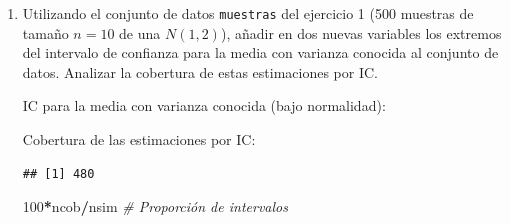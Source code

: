 \documentclass[
]{book}
\newenvironment{Shaded}{\begin{snugshade}}{\end{snugshade}}
\newcommand{\CommentTok}[1]{\textcolor[rgb]{0.56,0.35,0.01}{\textit{#1}}}
\newcommand{\DecValTok}[1]{\textcolor[rgb]{0.00,0.00,0.81}{#1}}
\newcommand{\FloatTok}[1]{\textcolor[rgb]{0.00,0.00,0.81}{#1}}
\newcommand{\KeywordTok}[1]{\textcolor[rgb]{0.13,0.29,0.53}{\textbf{#1}}}
\newcommand{\NormalTok}[1]{#1}
\newcommand{\OperatorTok}[1]{\textcolor[rgb]{0.81,0.36,0.00}{\textbf{#1}}}
\newcommand{\StringTok}[1]{\textcolor[rgb]{0.31,0.60,0.02}{#1}}
\theoremstyle{break}
\theoremstyle{definition}
\theoremstyle{definition}
\theoremstyle{definition}
\theoremstyle{remark}
\begin{document}
\begin{enumerate}
\def\labelenumi{\alph{enumi})}
\item
  Utilizando el conjunto de datos \texttt{muestras} del ejercicio 1 (500
  muestras de tamaño \(n=10\) de una \(N(1,2)\)), añadir en dos nuevas
  variables los extremos del intervalo de confianza para la media
  con varianza conocida al conjunto de datos. Analizar la
  cobertura de estas estimaciones por IC.

  IC para la media con varianza conocida (bajo normalidad):

\begin{Shaded}
\end{Shaded}

  Cobertura de las estimaciones por IC:

\begin{Shaded}
\end{Shaded}

\begin{verbatim}
## [1] 480
\end{verbatim}

\begin{Shaded}
\begin{Highlighting}[]
\DecValTok{100}\OperatorTok{*}\NormalTok{ncob}\OperatorTok{/}\NormalTok{nsim     }\CommentTok{# Proporción de intervalos}
\end{Highlighting}
\end{Shaded}


\end{enumerate}
\end{document}
